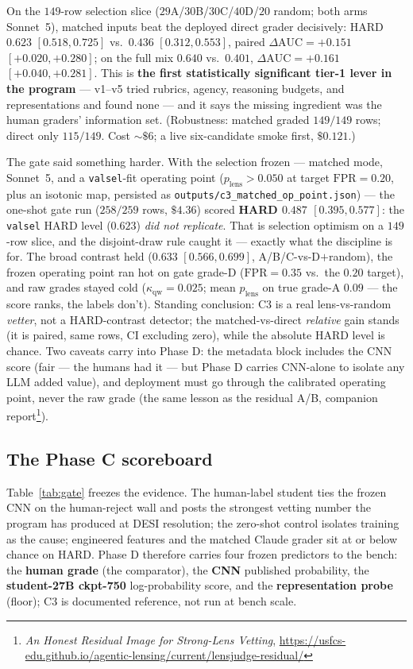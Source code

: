 \documentclass[11pt,letterpaper]{article}
\newcommand{\qwk}{\ensuremath{\kappa_{\mathrm{qw}}}}
\newcommand{\dauc}{\ensuremath{\Delta\mathrm{AUC}}}
\newcommand{\plens}{\ensuremath{p_{\mathrm{lens}}}}
\begin{document}
On the $149$-row selection slice ($29$A/$30$B/$30$C/$40$D/$20$ random; both arms
Sonnet~5), matched inputs beat the deployed direct grader decisively: HARD $0.623$
$[0.518,0.725]$ vs.\ $0.436$ $[0.312,0.553]$, paired
$\dauc=\mathbf{+0.151}$ $[+0.020,+0.280]$; on the full mix $0.640$ vs.\ $0.401$,
$\dauc=+0.161$ $[+0.040,+0.281]$. This is \textbf{the first statistically significant
tier-1 lever in the program} --- v1--v5 tried rubrics, agency, reasoning budgets, and
representations and found none --- and it says the missing ingredient was the human
graders' information set. (Robustness: matched graded $149/149$ rows; direct only
$115/149$. Cost ${\sim}\$6$; a live six-candidate smoke first, $\$0.121$.)

The gate said something harder. With the selection frozen --- matched mode, Sonnet~5,
and a \texttt{valsel}-fit operating point ($\plens>0.050$ at target
$\mathrm{FPR}=0.20$, plus an isotonic map, persisted as
\texttt{outputs/c3\_matched\_op\_point.json}) --- the one-shot gate run
($258/259$ rows, $\$4.36$) scored \textbf{HARD $0.487$ $[0.395,0.577]$}: the
\texttt{valsel} HARD level ($0.623$) \emph{did not replicate}. That is selection
optimism on a $149$-row slice, and the disjoint-draw rule caught it --- exactly what
the discipline is for. The broad contrast held ($0.633$ $[0.566,0.699]$,
A/B/C-vs-D$+$random), the frozen operating point ran hot on gate grade-D
($\mathrm{FPR}=0.35$ vs.\ the $0.20$ target), and raw grades stayed cold
($\qwk=0.025$; mean \plens{} on true grade-A $0.09$ --- the score ranks, the labels
don't). Standing conclusion: C3 is a real lens-vs-random \emph{vetter}, not a
HARD-contrast detector; the matched-vs-direct \emph{relative} gain stands (it is
paired, same rows, CI excluding zero), while the absolute HARD level is chance. Two
caveats carry into Phase D: the metadata block includes the CNN score (fair --- the
humans had it --- but Phase D carries CNN-alone to isolate any LLM added value), and
deployment must go through the calibrated operating point, never the raw grade
(the same lesson as the residual A/B, companion
report\footnote{\emph{An Honest Residual Image for Strong-Lens Vetting},
\url{https://usfcs-edu.github.io/agentic-lensing/current/lensjudge-residual/}}).

\subsection{The Phase C scoreboard}\label{sec:scoreboard}
Table~\ref{tab:gate} freezes the evidence. The human-label student ties the frozen CNN
on the human-reject wall and posts the strongest vetting number the program has
produced at DESI resolution; the zero-shot control isolates training as the cause;
engineered features and the matched Claude grader sit at or below chance on HARD.
Phase D therefore carries four frozen predictors to the bench: the \textbf{human
grade} (the comparator), the \textbf{CNN} published probability, the
\textbf{student-27B ckpt-750} log-probability score, and the \textbf{representation
probe} (floor); C3 is documented reference, not run at bench scale.
\end{document}
